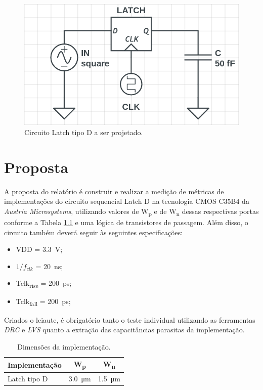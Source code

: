 \documentclass{iiufrgs}
\begin{document}
\begin{figure}[htb]
    \centering
    \caption{Circuito Latch tipo D a ser projetado.}
    \label{fig:xor2}
    \includegraphics[scale=0.5]{images/schem_pretty.png}
\end{figure}

\chapter{Proposta}\label{proposta}
A proposta do relatório é construir e realizar a medição de métricas de implementações do circuito sequencial Latch D na tecnologia CMOS C35B4 da \textit{Austria Microsystems}, utilizando valores de W\textsubscript{p} e de W\textsubscript{n} dessas respectivas portas conforme a Tabela \ref{tab:imp} e uma lógica de transistores de passagem.
Além disso, o circuito também deverá seguir às seguintes especificações:

\begin{itemize}[noitemsep]
    \setlength{\itemindent}{1em}
    \item VDD = \SI{3.3}{\V};
    \item $1/{f_{clk}}$ = \SI{20}{\ns};
    \item Tclk\textsubscript{rise} = \SI{200}{\ps};
    \item Tclk\textsubscript{fall} = \SI{200}{\ps};
\end{itemize}

Criados o leiaute, é obrigatório tanto o teste individual utilizando as ferramentas \textit{DRC} e \textit{LVS} quanto a extração das capacitâncias parasitas da implementação.

\begin{table}[ht]
    \centering
    \caption{Dimensões da implementação.}
    \label{tab:imp}
    \begin{tabular}{l c c}
        \hline
        Implementação
        & W\textsubscript{p}
        & W\textsubscript{n} \\ \hline
        Latch tipo D & \SI{3.0}{\um}    & \SI{1.5}{\um}     \\ \hline
    \end{tabular}
\end{table}
\end{document}
